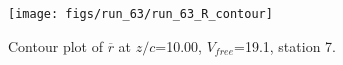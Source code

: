 \begin{figure}[H]
\centering
\texttt{[image: figs/run\_63/run\_63\_R\_contour]}
\caption{Contour plot of $\overline{r}$ at $z/c$=10.00, $V_{free}$=19.1, station 7.}
\end{figure}


